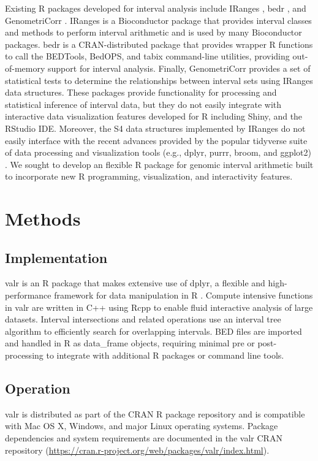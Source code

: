 \documentclass[9pt,a4paper]{extarticle}
\begin{document}
	Existing R packages developed for interval analysis include IRanges \cite{lawrence_software_2013}, bedr \cite{haider_bedr_2016}, and GenometriCorr \cite{favorov_exploring_2012}. IRanges is a Bioconductor package that provides  interval classes and methods to perform interval arithmetic and is used by many Bioconductor packages. bedr is a CRAN-distributed package that provides wrapper R functions to call the BEDTools, BedOPS, and tabix command-line utilities, providing out-of-memory support for interval analysis. Finally,  GenometriCorr provides a set of statistical tests to determine the relationships between interval sets using IRanges data structures. These packages provide  functionality for processing and statistical inference of interval data, but they do not easily integrate with interactive data visualization features developed for R including Shiny\cite{chang_shiny_2017}, and the RStudio IDE. Moreover, the S4 data structures implemented by IRanges do not easily interface with the recent advances provided by the popular tidyverse suite of data processing and visualization tools (e.g., dplyr, purrr, broom, and ggplot2) \cite{wickham_tidyverse_2017}. We sought to develop an flexible R package for genomic interval arithmetic built to incorporate new R programming, visualization, and interactivity features.

\section*{Methods}

\subsection*{Implementation}
valr is an R package that makes extensive use of dplyr, a flexible and high-performance framework for data manipulation in R \cite{wickham_dplyr_2016}. Compute intensive functions in valr are written in C++ using Rcpp to enable fluid interactive analysis of large datasets\cite{eddelbuettel_rcpp_2011}. Interval intersections and related operations use an interval tree algorithm to efficiently search for overlapping intervals\cite{cormen_2001}. BED files are imported and handled in R as data\_frame objects, requiring minimal pre or post-processing to integrate with additional R packages or command line tools.

\subsection*{Operation}
valr is distributed as part of the CRAN R package repository and is compatible with Mac OS X, Windows, and major Linux operating systems. Package dependencies and system requirements are documented in the valr CRAN repository (\url{https://cran.r-project.org/web/packages/valr/index.html}).
\end{document}
